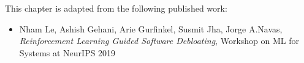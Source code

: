 This chapter is adapted from the following published work:
\begin{itemize}
    \item Nham Le, Ashish Gehani, Arie Gurfinkel, Susmit Jha, Jorge A.Navas, \textit{Reinforcement Learning Guided Software Debloating}, Workshop on ML for Systems at NeurIPS 2019
\end{itemize}
